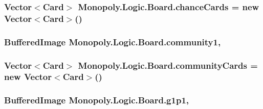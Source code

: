 \subsubsection[{\texorpdfstring{chance\+Cards}{chanceCards}}]{\setlength{\rightskip}{0pt plus 5cm}Vector$<${\bf Card}$>$ Monopoly.\+Logic.\+Board.\+chance\+Cards = new Vector$<${\bf Card}$>$()\hspace{0.3cm}{\ttfamily [private]}}\hypertarget{class_monopoly_1_1_logic_1_1_board_aaebf7a0020990db049c286e5778b0809}{}\label{class_monopoly_1_1_logic_1_1_board_aaebf7a0020990db049c286e5778b0809}
\subsubsection[{\texorpdfstring{community1}{community1}}]{\setlength{\rightskip}{0pt plus 5cm}Buffered\+Image Monopoly.\+Logic.\+Board.\+community1\hspace{0.3cm}{\ttfamily [static]}, {\ttfamily [protected]}}\hypertarget{class_monopoly_1_1_logic_1_1_board_a5cb4d4c2e50425ce6e342d8c35e4ed0f}{}\label{class_monopoly_1_1_logic_1_1_board_a5cb4d4c2e50425ce6e342d8c35e4ed0f}
\subsubsection[{\texorpdfstring{community\+Cards}{communityCards}}]{\setlength{\rightskip}{0pt plus 5cm}Vector$<${\bf Card}$>$ Monopoly.\+Logic.\+Board.\+community\+Cards = new Vector$<${\bf Card}$>$()\hspace{0.3cm}{\ttfamily [private]}}\hypertarget{class_monopoly_1_1_logic_1_1_board_a48b98e8f6f9319826d2faf5ff88172a2}{}\label{class_monopoly_1_1_logic_1_1_board_a48b98e8f6f9319826d2faf5ff88172a2}
\subsubsection[{\texorpdfstring{g1p1}{g1p1}}]{\setlength{\rightskip}{0pt plus 5cm}Buffered\+Image Monopoly.\+Logic.\+Board.\+g1p1\hspace{0.3cm}{\ttfamily [static]}, {\ttfamily [protected]}}\hypertarget{class_monopoly_1_1_logic_1_1_board_a79ef8aae1c6b842096b29f3db5080423}{}\label{class_monopoly_1_1_logic_1_1_board_a79ef8aae1c6b842096b29f3db5080423}
